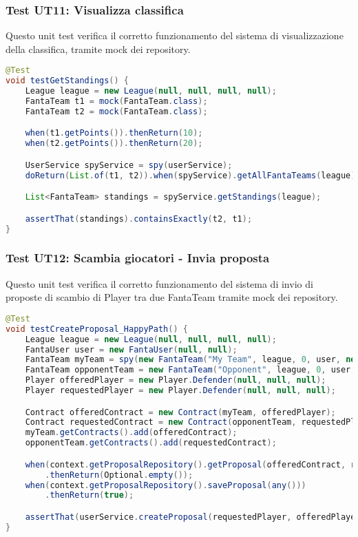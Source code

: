 \subsubsection{Test UT11: Visualizza classifica} \label{UT11}

Questo unit test verifica il corretto funzionamento del sistema di visualizzazione della classifica,
tramite mock dei repository.

\begin{lstlisting}[language=Java]
@Test
void testGetStandings() {
	League league = new League(null, null, null, null);
	FantaTeam t1 = mock(FantaTeam.class);
	FantaTeam t2 = mock(FantaTeam.class);

	when(t1.getPoints()).thenReturn(10);
	when(t2.getPoints()).thenReturn(20);

	UserService spyService = spy(userService);
	doReturn(List.of(t1, t2)).when(spyService).getAllFantaTeams(league);

	List<FantaTeam> standings = spyService.getStandings(league);

	assertThat(standings).containsExactly(t2, t1);
}
\end{lstlisting}


\subsubsection{Test UT12: Scambia giocatori - Invia proposta} \label{UT12}

Questo unit test verifica il corretto funzionamento del sistema di invio di proposte di scambio di Player tra due FantaTeam
tramite mock dei repository.

\begin{lstlisting}[language=Java]
@Test
void testCreateProposal_HappyPath() {
	League league = new League(null, null, null, null);
	FantaUser user = new FantaUser(null, null);
	FantaTeam myTeam = spy(new FantaTeam("My Team", league, 0, user, new HashSet<>()));
	FantaTeam opponentTeam = new FantaTeam("Opponent", league, 0, user, new HashSet<>());
	Player offeredPlayer = new Player.Defender(null, null, null);
	Player requestedPlayer = new Player.Defender(null, null, null);

	Contract offeredContract = new Contract(myTeam, offeredPlayer);
	Contract requestedContract = new Contract(opponentTeam, requestedPlayer);
	myTeam.getContracts().add(offeredContract);
	opponentTeam.getContracts().add(requestedContract);

	when(context.getProposalRepository().getProposal(offeredContract, requestedContract))
		.thenReturn(Optional.empty());
	when(context.getProposalRepository().saveProposal(any()))
        .thenReturn(true);

	assertThat(userService.createProposal(requestedPlayer, offeredPlayer, myTeam, opponentTeam)).isTrue();
}
\end{lstlisting}


